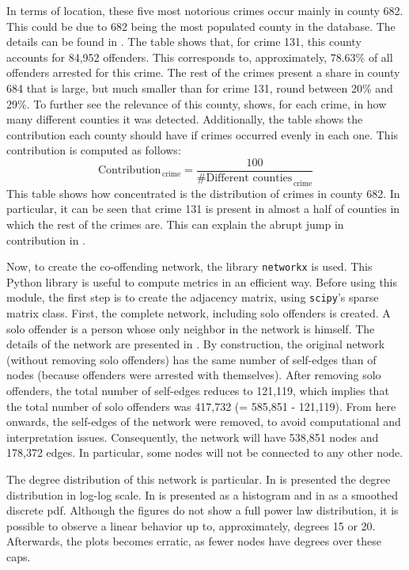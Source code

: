 \documentclass[11pt, english]{article}
\begin{document}
\begin{multicols}{2}
In terms of location, these five most notorious crimes occur mainly in county 682. This could be due to 682 being the most populated county in the database. The details can be found in . The table shows that, for crime 131, this county accounts for 84,952 offenders. This corresponds to, approximately, 78.63\% of all offenders arrested for this crime. The rest of the crimes present a share in county 684 that is large, but much smaller than for crime 131, round between 20\% and 29\%. To further see the relevance of this county,  shows, for each crime, in how many different counties it was detected. Additionally, the table shows the contribution each county should have if crimes occurred evenly in each one. This contribution is computed as follows:
  $$ \text{Contribution}_{\,\text{crime}} = \frac{100}{\text{\# Different counties}_{\,\text{crime}}} $$
This table shows how concentrated is the distribution of crimes in county 682. In particular, it can be seen that crime 131 is present in almost a half of counties in which the rest of the crimes are. This can explain the abrupt jump in contribution in . 

Now, to create the co-offending network, the library \texttt{networkx} is used. This Python library is useful to compute metrics in an efficient way. Before using this module, the first step is to create the adjacency matrix, using \texttt{scipy}'s sparse matrix class. First, the complete network, including solo offenders is created. A solo offender is a person whose only neighbor in the network is himself. The details of the network are presented in . By construction, the original network (without removing solo offenders) has the same number of self-edges than of nodes (because offenders were arrested with themselves). After removing solo offenders, the total number of self-edges reduces to 121,119, which implies that the total number of solo offenders was 417,732 (= 585,851 - 121,119). From here onwards, the self-edges of the network were removed, to avoid computational and interpretation issues. Consequently, the network will have 538,851 nodes and 178,372 edges. In particular, some nodes will not be connected to any other node.

The degree distribution of this network is particular. In  is presented the degree distribution in log-log scale. In  is presented as a histogram and in  as a smoothed discrete pdf. Although the figures do not show a full power law distribution, it is possible to observe a linear behavior up to, approximately, degrees 15 or 20. Afterwards, the plots becomes erratic, as fewer nodes have degrees over these caps.
 

\end{multicols}
\end{document}
